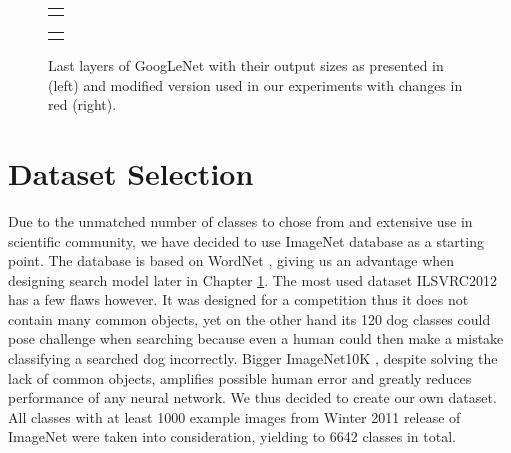 \begin{figure}
	\centering
	
	\begin{tabular}{@{}c@{}}
		\subfloat{
			
		}
	\end{tabular}
	\begin{tabular}{@{}c@{}}
		\subfloat{
			
		}
	\end{tabular}
	
	\caption[Last layers of GoogLeNet]{Last layers of GoogLeNet with their output sizes as presented in \cite{szegedy2015going} (left) and modified version used in our experiments with changes in red (right).}
	\label{fig:inception_end}
\end{figure}



\section{Dataset Selection}
Due to the unmatched number of classes to chose from and extensive use in scientific community, we have decided to use ImageNet database \cite{ILSVRC15} as a starting point. The database is based on WordNet \cite{WordNet}, giving us an advantage when designing search model later in Chapter \ref{}. The most used dataset ILSVRC2012 has a few flaws however. It was designed for a competition thus it does not contain many common objects, yet on the other hand its 120 dog classes could pose challenge when searching because even a human could then make a mistake classifying a searched dog incorrectly. Bigger ImageNet10K \cite{deng2010does}, despite solving the lack of common objects, amplifies possible human error and greatly reduces performance of any neural network. We thus decided to create our own dataset. All classes with at least 1000 example images from Winter 2011 release of ImageNet were taken into consideration, yielding to 6642 classes in total.

